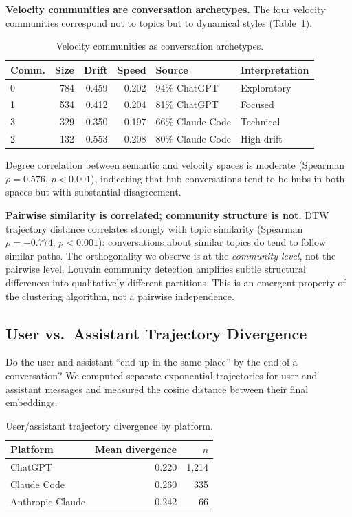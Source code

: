 \documentclass[11pt]{article}
\begin{document}
\textbf{Velocity communities are conversation archetypes.} The four velocity communities correspond not to topics but to dynamical styles (Table~\ref{tab:archetypes}).

\begin{table}[h]
\centering
\caption{Velocity communities as conversation archetypes.}
\label{tab:archetypes}
\begin{tabular}{lrrrll}
\toprule
Comm. & Size & Drift & Speed & Source & Interpretation \\
\midrule
0 & 784 & 0.459 & 0.202 & 94\% ChatGPT & Exploratory \\
1 & 534 & 0.412 & 0.204 & 81\% ChatGPT & Focused \\
3 & 329 & 0.350 & 0.197 & 66\% Claude Code & Technical \\
2 & 132 & 0.553 & 0.208 & 80\% Claude Code & High-drift \\
\bottomrule
\end{tabular}
\end{table}

Degree correlation between semantic and velocity spaces is moderate (Spearman $\rho = 0.576$, $p < 0.001$), indicating that hub conversations tend to be hubs in both spaces but with substantial disagreement.

\textbf{Pairwise similarity is correlated; community structure is not.} DTW trajectory distance correlates strongly with topic similarity (Spearman $\rho = -0.774$, $p < 0.001$): conversations about similar topics do tend to follow similar paths. The orthogonality we observe is at the \emph{community level}, not the pairwise level. Louvain community detection amplifies subtle structural differences into qualitatively different partitions. This is an emergent property of the clustering algorithm, not a pairwise independence.

\subsection{User vs.\ Assistant Trajectory Divergence}

Do the user and assistant ``end up in the same place'' by the end of a conversation? We computed separate exponential trajectories for user and assistant messages and measured the cosine distance between their final embeddings.

\begin{table}[h]
\centering
\caption{User/assistant trajectory divergence by platform.}
\label{tab:divergence}
\begin{tabular}{lrr}
\toprule
Platform & Mean divergence & $n$ \\
\midrule
ChatGPT & 0.220 & 1,214 \\
Claude Code & 0.260 & 335 \\
Anthropic Claude & 0.242 & 66 \\
\bottomrule
\end{tabular}
\end{table}
\end{document}
